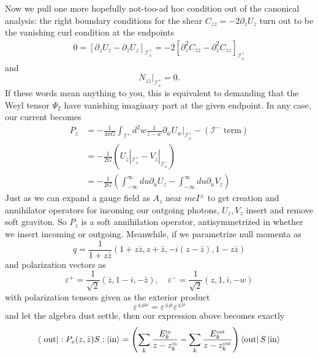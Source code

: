 \documentclass[11pt,letterpaper]{article}
\newcommand{\LP}{\left(}
\newcommand{\RP}{\right)}
\newcommand{\mc}[1]{\mathcal{#1}}
\newcommand{\D}{\partial}
\newcommand{\KET}[1]{\left| #1 \right\rangle }
\newcommand{\BRA}[1]{\left\langle #1 \right| }
\begin{document}
Now we pull one more hopefully not-too-ad hoc condition out of the canonical analysis: the right boundary conditions for the shear $C_{zz} = - 2\D_z U_z$ turn out to be the vanishing curl condition at the endpoints \begin{equation}
\begin{aligned}
0 = \left[ \D_z U_{\bar{z}} - \D_{\bar{z}} U_z \right]_{\mc{I}^+_\pm} = -2 \left[ \D_z^2 C_{\bar{z} \bar{z}} - \D_{\bar{z}}^2 C_{zz} \right]_{\mc{I}^+_\pm}
\end{aligned}
\end{equation}
and \begin{equation}
N_{zz} |_{\mc{I}^+_\pm} = 0.
\end{equation}
If these words mean anything to you, this is equivalent to demanding that the Weyl tensor $\Psi_2$ have vanishing imaginary part at the given endpoint. In any case, our current becomes \begin{equation}
\begin{aligned}
P_z & = -\frac{1}{4 \pi G} \int_{\mc{I}^+} d^2 w \frac{1}{z - w} \left. \D_{\bar{w}}  U_w \right|_{\mc{I}^+_\pm} - \LP \mc{I}^- \mbox{ term} \RP \\
& = - \frac{1}{2 G} \LP U_z | _{\mc{I}^+_\pm} - V_z |_{\mc{I}^-_\pm} \RP \\
& = - \frac{1}{2 G} \LP \int_{-\infty}^{\infty} du \D_u U_z - \int_{-\infty}^{\infty} du \D_u V_z \RP
\end{aligned}
\end{equation}
Just as we can expand a gauge field as $A_z$ near $mc{I}^\pm$ to get creation and annihilator operators for incoming our outgoing photons, $U_z, V_z$ insert and remove soft graviton. So $P_z$ is a soft annihilation operator, antisymmetrized in whether we insert incoming or outgoing. Meanwhile, if we parametrize null momenta as \begin{equation}
q = \frac{1}{1 + z \bar{z}} \LP 1 + z \bar{z}, z + \bar{z}, -i (z - \bar{z}), 1 - z \bar{z} \RP
\end{equation}
and polarization vectors as \begin{equation}
\varepsilon^+ = \frac{1}{\sqrt{2}} \LP \bar{z}, 1 -i, - \bar{z} \RP, \quad \varepsilon^- = \frac{1}{\sqrt{2}} \LP z, 1, i, -w \RP
\end{equation}
with polarization tensors given as the exterior product \begin{equation}
\varepsilon^{\pm \mu \nu} = \varepsilon^{\pm \mu} \varepsilon^{\pm \nu}
\end{equation}
and let the algebra dust settle, then our expression above becomes exactly \begin{equation}
\BRA{\mbox{ out}} : P_z(z, \bar{z}) S: \KET{\mbox{in}} = \LP \sum_k \frac{E^{\mbox{\tiny{in}}}_k }{z - z^{\mbox{\tiny{in}}}_k} - \sum_k \frac{E^{\mbox{\tiny{out}}}_k}{z - z^{\mbox{\tiny{out}}}_k} \RP \BRA{\mbox{out}} S \KET{\mbox{in}}
\end{equation}
\end{document}
